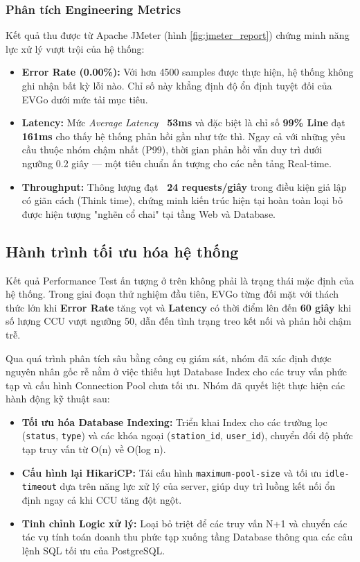\subsubsection{Phân tích Engineering Metrics}
\hspace*{\parindent} Kết quả thu được từ Apache JMeter (hình \ref{fig:jmeter_report}) chứng minh năng lực xử lý vượt trội của hệ thống:
\begin{itemize}
    \item \textbf{Error Rate (0.00\%):} Với hơn 4500 samples được thực hiện, hệ thống không ghi nhận bất kỳ lỗi nào. Chỉ số này khẳng định độ ổn định tuyệt đối của EVGo dưới mức tải mục tiêu.
    \item \textbf{Latency:} Mức \textit{Average Latency} \textbf{~53ms} và đặc biệt là chỉ số \textbf{99\% Line} đạt \textbf{161ms} cho thấy hệ thống phản hồi gần như tức thì. Ngay cả với những yêu cầu thuộc nhóm chậm nhất (P99), thời gian phản hồi vẫn duy trì dưới ngưỡng 0.2 giây — một tiêu chuẩn ấn tượng cho các nền tảng Real-time.
    \item \textbf{Throughput:} Thông lượng đạt \textbf{~24 requests/giây} trong điều kiện giả lập có giãn cách (Think time), chứng minh kiến trúc hiện tại hoàn toàn loại bỏ được hiện tượng "nghẽn cổ chai" tại tầng Web và Database.
\end{itemize}

\subsection{Hành trình tối ưu hóa hệ thống}

\hspace*{\parindent} Kết quả Performance Test ấn tượng ở trên không phải là trạng thái mặc định của hệ thống. Trong giai đoạn thử nghiệm đầu tiên, EVGo từng đối mặt với thách thức lớn khi \textbf{Error Rate} tăng vọt và \textbf{Latency} có thời điểm lên đến \textbf{60 giây} khi số lượng CCU vượt ngưỡng 50, dẫn đến tình trạng treo kết nối và phản hồi chậm trễ.

Qua quá trình phân tích sâu bằng công cụ giám sát, nhóm đã xác định được nguyên nhân gốc rễ nằm ở việc thiếu hụt Database Index cho các truy vấn phức tạp và cấu hình Connection Pool chưa tối ưu. Nhóm đã quyết liệt thực hiện các hành động kỹ thuật sau:
\begin{itemize}
    \item \textbf{Tối ưu hóa Database Indexing:} Triển khai Index cho các trường lọc (\texttt{status}, \texttt{type}) và các khóa ngoại (\texttt{station\_id}, \texttt{user\_id}), chuyển đổi độ phức tạp truy vấn từ O(n) về O(log n).
    \item \textbf{Cấu hình lại HikariCP:} Tái cấu hình \texttt{maximum-pool-size} và tối ưu \texttt{idle-timeout} dựa trên năng lực xử lý của server, giúp duy trì luồng kết nối ổn định ngay cả khi CCU tăng đột ngột.
    \item \textbf{Tinh chỉnh Logic xử lý:} Loại bỏ triệt để các truy vấn N+1 và chuyển các tác vụ tính toán doanh thu phức tạp xuống tầng Database thông qua các câu lệnh SQL tối ưu của PostgreSQL.
\end{itemize}

